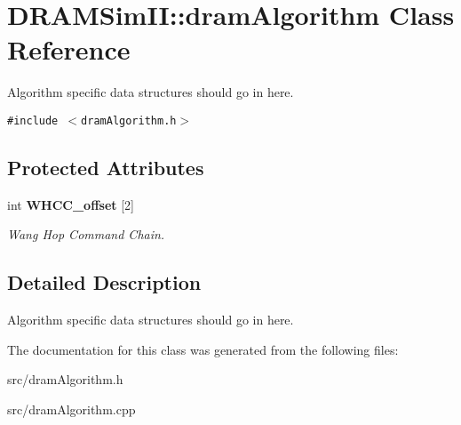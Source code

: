 \section{DRAMSimII::dramAlgorithm Class Reference}
\label{class_d_r_a_m_sim_i_i_1_1dram_algorithm}
Algorithm specific data structures should go in here.  


{\tt \#include $<$dramAlgorithm.h$>$}

\subsection*{Protected Attributes}
\begin{CompactItemize}
\item 
int {\bf WHCC\_\-offset} [2]\label{class_d_r_a_m_sim_i_i_1_1dram_algorithm_4b7625ded65d288f4220c188f8598e0d}

\begin{CompactList}\small\item\em Wang Hop Command Chain. \item\end{CompactList}\end{CompactItemize}


\subsection{Detailed Description}
Algorithm specific data structures should go in here. 

The documentation for this class was generated from the following files:\begin{CompactItemize}
\item 
src/dramAlgorithm.h\item 
src/dramAlgorithm.cpp\end{CompactItemize}
